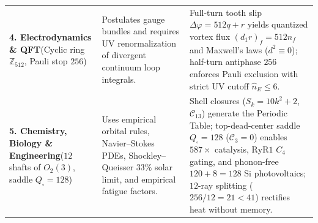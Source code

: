 \documentclass[11pt,a4paper]{article}
\theoremstyle{plain}
\theoremstyle{definition}
\begin{document}
\begin{table}[htbp]
\begin{tabular}{@{}p{}p{}p{}@{}}
\addlinespace[3pt]
\textbf{4. Electrodynamics \& QFT}\newline (Cyclic ring $\mathbb{Z}_{512}$, Pauli stop $256$) &
Postulates gauge bundles and requires UV renormalization of divergent continuum loop integrals. &
Full-turn tooth slip $\Delta\varphi = 512 q + r$ yields quantized vortex flux $(d_1 r)_f = 512 n_f$ and Maxwell's laws ($d^2\equiv 0$); half-turn antiphase $256$ enforces Pauli exclusion with strict UV cutoff $\hat{n}_E\le 6$. \\
\addlinespace[3pt]
\textbf{5. Chemistry, Biology \& Engineering}\newline ($12$ shafts of $O_2(3)$, saddle $Q_\square=128$) &
Uses empirical orbital rules, Navier--Stokes PDEs, Shockley--Queisser $33\%$ solar limit, and empirical fatigue factors. &
Shell closures ($S_k=10k^2+2$, $\mathcal{C}_{13}$) generate the Periodic Table; top-dead-center saddle $Q_\square=128$ ($\mathcal{C}_3=0$) enables $587\times$ catalysis, $\mathrm{RyR1}$ $C_4$ gating, and phonon-free $120+8=128$ Si photovoltaics; $12$-ray splitting ($256/12=21<41$) rectifies heat without memory. \\
\bottomrule
\end{tabular}
\end{table}
\end{document}
